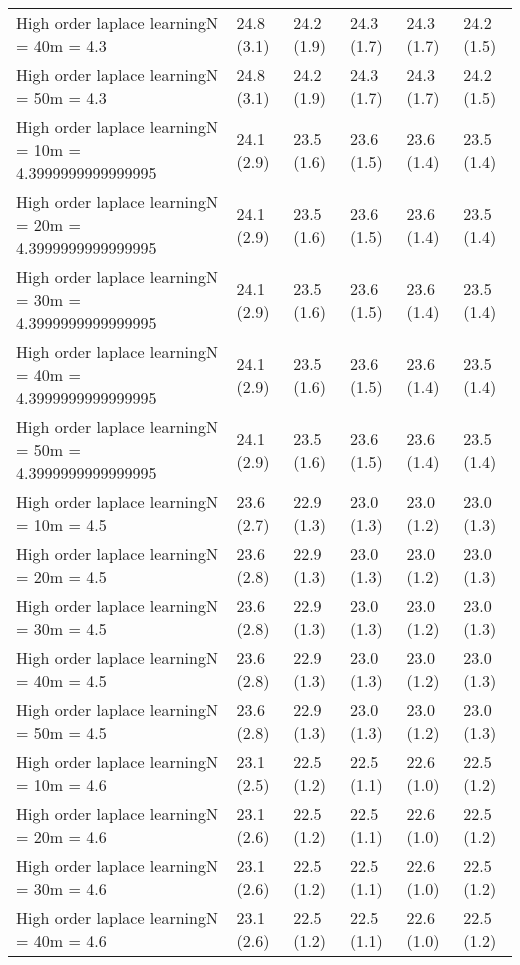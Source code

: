 \documentclass{article}
\begin{document}
\begin{table*}[t!]
\begin{center}
\begin{small}
\begin{sc}
\begin{tabular}{llllll}
High order laplace learningN = 40m = 4.3&24.8 (3.1)      &24.2 (1.9)      &24.3 (1.7)      &24.3 (1.7)      &24.2 (1.5)      \\
High order laplace learningN = 50m = 4.3&24.8 (3.1)      &24.2 (1.9)      &24.3 (1.7)      &24.3 (1.7)      &24.2 (1.5)      \\
High order laplace learningN = 10m = 4.3999999999999995&24.1 (2.9)      &23.5 (1.6)      &23.6 (1.5)      &23.6 (1.4)      &23.5 (1.4)      \\
High order laplace learningN = 20m = 4.3999999999999995&24.1 (2.9)      &23.5 (1.6)      &23.6 (1.5)      &23.6 (1.4)      &23.5 (1.4)      \\
High order laplace learningN = 30m = 4.3999999999999995&24.1 (2.9)      &23.5 (1.6)      &23.6 (1.5)      &23.6 (1.4)      &23.5 (1.4)      \\
High order laplace learningN = 40m = 4.3999999999999995&24.1 (2.9)      &23.5 (1.6)      &23.6 (1.5)      &23.6 (1.4)      &23.5 (1.4)      \\
High order laplace learningN = 50m = 4.3999999999999995&24.1 (2.9)      &23.5 (1.6)      &23.6 (1.5)      &23.6 (1.4)      &23.5 (1.4)      \\
High order laplace learningN = 10m = 4.5&23.6 (2.7)      &22.9 (1.3)      &23.0 (1.3)      &23.0 (1.2)      &23.0 (1.3)      \\
High order laplace learningN = 20m = 4.5&23.6 (2.8)      &22.9 (1.3)      &23.0 (1.3)      &23.0 (1.2)      &23.0 (1.3)      \\
High order laplace learningN = 30m = 4.5&23.6 (2.8)      &22.9 (1.3)      &23.0 (1.3)      &23.0 (1.2)      &23.0 (1.3)      \\
High order laplace learningN = 40m = 4.5&23.6 (2.8)      &22.9 (1.3)      &23.0 (1.3)      &23.0 (1.2)      &23.0 (1.3)      \\
High order laplace learningN = 50m = 4.5&23.6 (2.8)      &22.9 (1.3)      &23.0 (1.3)      &23.0 (1.2)      &23.0 (1.3)      \\
High order laplace learningN = 10m = 4.6&23.1 (2.5)      &22.5 (1.2)      &22.5 (1.1)      &22.6 (1.0)      &22.5 (1.2)      \\
High order laplace learningN = 20m = 4.6&23.1 (2.6)      &22.5 (1.2)      &22.5 (1.1)      &22.6 (1.0)      &22.5 (1.2)      \\
High order laplace learningN = 30m = 4.6&23.1 (2.6)      &22.5 (1.2)      &22.5 (1.1)      &22.6 (1.0)      &22.5 (1.2)      \\
High order laplace learningN = 40m = 4.6&23.1 (2.6)      &22.5 (1.2)      &22.5 (1.1)      &22.6 (1.0)      &22.5 (1.2)      \\

\end{tabular}
\end{sc}
\end{small}
\end{center}
\end{table*}
\end{document}
